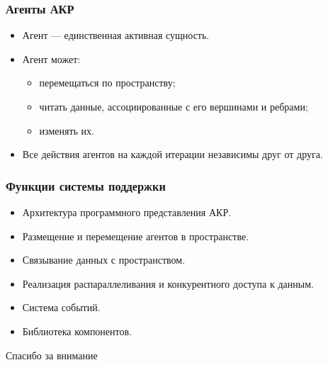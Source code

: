 \documentclass[14pt]{beamer}
\begin{document}
\begin{frame}
    \frametitle{Агенты АКР}
    \begin{itemize}
        \item Агент --- единственная активная сущность.
        \item Агент может:
            \begin{itemize}
                \item перемещаться по пространству;
                \item читать данные, ассоциированные с его вершинами и ребрами;
                \item изменять их.
            \end{itemize}
        \item Все действия агентов на каждой итерации независимы друг от друга.
    \end{itemize}
\end{frame}

\begin{frame}
    \frametitle{Функции системы поддержки}
    \begin{itemize}
        \item Архитектура программного представления АКР.
        \item Размещение и перемещение агентов в пространстве.
        \item Связывание данных с пространством.
        \item Реализация распараллеливания и конкурентного доступа к данным.
        \item Система событий.
        \item Библиотека компонентов.
    \end{itemize}
\end{frame}

\begin{frame}
    \begin{center}
        Спасибо за внимание
    \end{center}
\end{frame}
\end{document}
